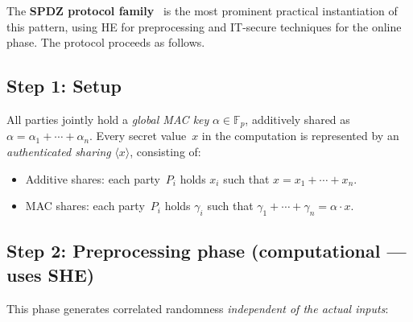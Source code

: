 \documentclass{article}
\begin{document}
The \textbf{SPDZ protocol family}~\cite{SPDZ2012springer} is the most prominent practical instantiation of this pattern, using HE for preprocessing and IT-secure techniques for the online phase. The protocol proceeds as follows.

\subsection*{Step 1: Setup}

All parties jointly hold a \emph{global MAC key} $\alpha \in \mathbb{F}_p$, additively shared as $\alpha = \alpha_1 + \cdots + \alpha_n$. Every secret value~$x$ in the computation is represented by an \emph{authenticated sharing} $\langle x \rangle$, consisting of:
\begin{itemize}
  \item Additive shares: each party~$P_i$ holds $x_i$ such that $x = x_1 + \cdots + x_n$.
  \item MAC shares: each party~$P_i$ holds $\gamma_i$ such that $\gamma_1 + \cdots + \gamma_n = \alpha \cdot x$.
\end{itemize}

\subsection*{Step 2: Preprocessing phase (computational --- uses SHE)}

This phase generates correlated randomness \emph{independent of the actual inputs}:
\end{document}
